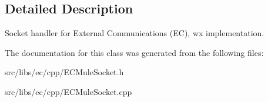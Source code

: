 \subsection{Detailed Description}
Socket handler for External Communications (EC), wx implementation. 

The documentation for this class was generated from the following files:\begin{DoxyCompactItemize}
\item 
src/libs/ec/cpp/ECMuleSocket.h\item 
src/libs/ec/cpp/ECMuleSocket.cpp\end{DoxyCompactItemize}
